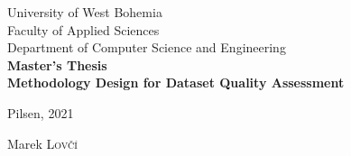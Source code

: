 \linespread{1}

\begin{titlepage}

    \newcommand{\HRule}{\rule{\linewidth}{0.5mm}} %

    \center{} %


    {\huge University of West Bohemia}\\[.5cm] %
    {\huge Faculty of Applied Sciences}\\[.5cm] %
    {\huge Department of Computer Science and Engineering}\\[4cm] %

    {\Huge \bfseries Master's Thesis}\\[2cm] %


    {\Huge \bfseries Methodology Design for Dataset Quality Assessment}\\[11cm] %


    \begin{minipage}[t]{0.49\textwidth}
        \begin{flushleft}
            \Large Pilsen, 2021
        \end{flushleft}
    \end{minipage}
    \begin{minipage}[t]{0.49\textwidth}
        \begin{flushright}
            \Large Marek \textsc{Lovčí}
        \end{flushright}
    \end{minipage}\\ %


\end{titlepage}
